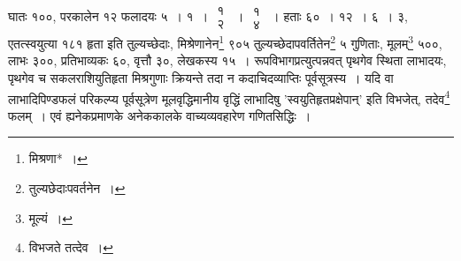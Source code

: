 \documentclass[10pt, openany]{book}
\begin{document}
{
{घातः १००, परकालेन १२ फलादयः ५~। १~। $\begin{matrix}

\mbox{{१}}\\

\mbox{{२}}

\end{matrix}$~। $\begin{matrix}

\mbox{{१}}\\

\mbox{{४}}

\end{matrix}$~। हताः ६०~। १२~। ६~। ३, एतत्स्वयुत्या}
{१८१ हृता इति तुल्यच्छेदाः, मिश्रेणानेन\renewcommand{\thefootnote}{\s ५}\footnote{\s मिश्रणा*~।} ९०५
तुल्यच्छेदापवर्तितेन\renewcommand{\thefootnote}{\s ६}\footnote{\s तुल्यछेदाःपवर्तनेन~।} ५ गुणिताः, मूलम्\renewcommand{\thefootnote}{\s ७}\footnote{\s मूल्यं~।} ५००,}
{लाभः ३००, प्रतिभाव्यकः ६०, वृत्तौ ३०, लेखकस्य १५~।
रूपविभागप्रत्युत्पन्नवत् पृथगेव}
{स्थिता लाभादयः, पृथगेव च सकलराशियुतिहृता मिश्रगुणाः क्रियन्ते तदा न
कदाचिदव्याप्तिः}
{पूर्वसूत्रस्य~। यदि वा लाभादिपिण्डफलं परिकल्प्य पूर्वसूत्रेण
मूलवृद्धिमानीय वृद्धिं लाभादिषु}
{'स्वयुतिहृतप्रक्षेपान्' इति विभजेत्, तदेव\renewcommand{\thefootnote}{\s ८}\footnote{\s विभजते तत्देव~।} फलम्~। एवं
ह्यनेकप्रमाणके अनेककालके वाच्यव्यवहारेण गणितसिद्धिः~।}

}
\end{document}
